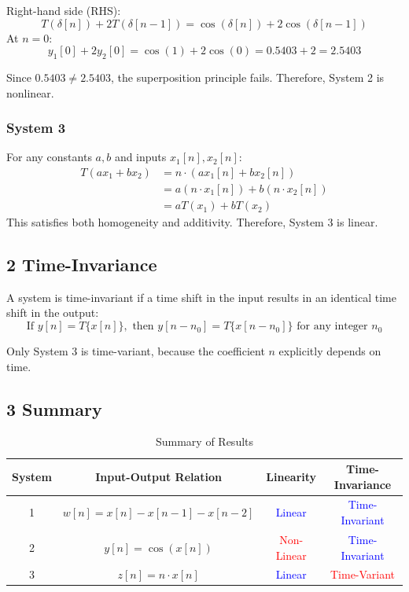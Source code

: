 \documentclass[12pt]{article}
\begin{document}
Right-hand side (RHS):
\[
T(\delta[n]) + 2T(\delta[n-1]) = \cos(\delta[n]) + 2\cos(\delta[n-1])
\]
At \(n = 0\):
\[
y_1[0] + 2y_2[0] = \cos(1) + 2\cos(0) = 0.5403 + 2 = 2.5403
\]

Since \(0.5403 \neq 2.5403\), the superposition principle fails. Therefore, System 2 is nonlinear.

\subsubsection*{System 3}

 For any constants \(a, b\) and inputs \(x_1[n], x_2[n]\):
\begin{align}
T(ax_1 + bx_2) &= n \cdot (ax_1[n] + bx_2[n]) \\
&= a(n \cdot x_1[n]) + b(n \cdot x_2[n]) \\
&= aT(x_1) + bT(x_2)
\end{align}
This satisfies both homogeneity and additivity. Therefore, System 3 is linear.
\subsection*{2 Time-Invariance}


A system is time-invariant if a time shift in the input results in an identical time shift in the output:
\[
\text{If } y[n] = T\{x[n]\}, \text{ then } y[n - n_0] = T\{x[n - n_0]\} \text{ for any integer } n_0
\]

Only System 3 is time-variant, because the coefficient \(n\) explicitly depends on time.

\subsection*{3 Summary}
\begin{table}[H]
\centering
\caption{Summary of Results}
\begin{tabular}{|c|c|c|c|}
\hline
\textbf{System} & \textbf{Input-Output Relation} & \textbf{Linearity} & \textbf{Time-Invariance} \\
\hline
1 & $w[n] = x[n] - x[n-1] - x[n-2]$ & \textcolor{blue}{Linear} & \textcolor{blue}{Time-Invariant} \\
2 & $y[n] = \cos(x[n])$ & \textcolor{red}{Non-Linear} & \textcolor{blue}{Time-Invariant} \\
3 & $z[n] = n \cdot x[n]$ & \textcolor{blue}{Linear} & \textcolor{red}{Time-Variant} \\
\hline
\end{tabular}
\end{table}
\end{document}
